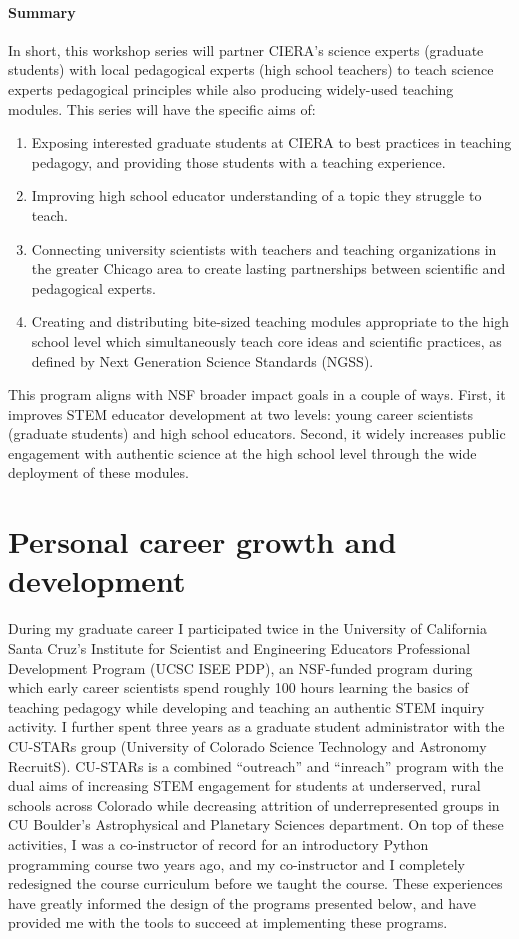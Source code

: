 \documentclass[11pt, preprint]{aastex}
\begin{document}
\paragraph{Summary}
In short, this workshop series will partner CIERA's science experts (graduate students) with local pedagogical experts (high school teachers) to teach science experts pedagogical principles while also producing widely-used teaching modules.
This series will have the specific aims of:
\begin{enumerate}
\item Exposing interested graduate students at CIERA to best practices in teaching pedagogy, and providing those students with a teaching experience.
\item Improving high school educator understanding of a topic they struggle to teach.
\item Connecting university scientists with teachers and teaching organizations in the greater Chicago area to create lasting partnerships between scientific and pedagogical experts.
\item Creating and distributing bite-sized teaching modules appropriate to the high school level which simultaneously teach core ideas and scientific practices, as defined by Next Generation Science Standards (NGSS).
\end{enumerate}
This program aligns with NSF broader impact goals in a couple of ways.
First, it improves STEM educator development at two levels: young career scientists (graduate students) and high school educators.
Second, it widely increases public engagement with authentic science at the high school level through the wide deployment of these modules.




\section{Personal career growth and development}
\label{sct:personal_growth}
During my graduate career I participated twice in the University of California Santa Cruz's Institute for Scientist and Engineering Educators Professional Development Program (UCSC ISEE PDP), an NSF-funded program during which early career scientists spend roughly 100 hours learning the basics of teaching pedagogy while developing and teaching an authentic STEM inquiry activity.
I further spent three years as a graduate student administrator with the CU-STARs group (University of Colorado Science Technology and Astronomy RecruitS).
CU-STARs is a combined ``outreach'' and ``inreach'' program with the dual aims of increasing STEM engagement for students at underserved, rural schools across Colorado while decreasing attrition of underrepresented groups in CU Boulder's Astrophysical and Planetary Sciences department.
On top of these activities, I was a co-instructor of record for an introductory Python programming course two years ago, and my co-instructor and I completely redesigned the course curriculum before we taught the course.
These experiences have greatly informed the design of the programs presented below, and have provided me with the tools to succeed at implementing these programs.
\end{document}
